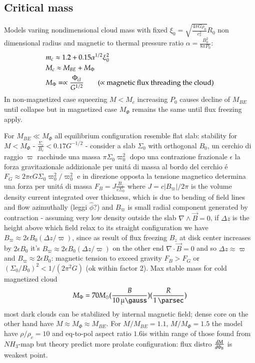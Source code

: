\documentclass[main.tex]{subfiles}
\begin{document}
\subsection{Critical mass}
Models variing nondimensional cloud mass with fixed $\xi_0=\sqrt{\frac{4\pi G\rho_0}{c_s^2}}R_0$ non dimensional radius and magnetic to thermal pressure ratio $\alpha=\frac{B_0^2}{8\pi P_0}$:
\begin{align*}
&m_c\approx1.2+0.15\alpha\expy{1/2}\xi_0^2\\
&M_c\approx M_{BE}+M_{\Phi}\\
&M_{\Phi}=\propto\frac{\Phi_{cl}}{G^{1/2}}\tag{$\propto$ magnetic flux threading the cloud}
\end{align*}
In non-magnetized case squeezing $M<M_c$ increasing $P_0$ causes decline of $M_{BE}$ until collapse but in magnetized case $M_{\Phi}$ remains the same until flux freezing apply.

For $M_{BE}\ll M_{\Phi}$ all equilibrium configuration resemble flat slab: stability for $M<M_{\Phi}$ - $\frac{\Sigma_c}{B_c}<0.17G^{-1/2}$ - consider a slab $\Sigma_0$ with orthogonal $B_0$, un cerchio di raggio $\varpi$ racchiude una massa $\pi\Sigma_0\varpi_0^2$ dopo una contrazione frazionale $\epsilon$ la forza gravitazionale addizionale per unit\'a di massa al bordo del cerchio \'e $F_G\approx2\pi\epsilon G\Sigma_0\varpi_0^2/\varpi_0^2$ e in direzione opposta la tensione magnetico determina una forza per unit\'a di massa $F_B=J\frac{B_z}{c\Sigma_0}$ where $J=c|B_{\varpi}|/2\pi$ is the volume density current integrated over thickness, which is due to bending of field lines and flow azimuthally (leggi $\hat{\phi}$?) and $B_{\varpi}$ is small radial component generated by contraction - assuming very low density outside the slab $\nabla\wedge\vec{B}=0$, if $\Delta z$ is the height above which field relax to its straight configuration we have $B_{\varpi}\approx2\epsilon B_0(\Delta z/\varpi)$, since as result of flux freezing $B_z$ at disk center increases by $2\epsilon B_0$ it's $B_{\varpi}\approx2\epsilon B_0(\Delta z/\varpi)$ on the other end $\nabla\cdot\vec{B}=0$  and so $\Delta z\approx\varpi$ and $B_{\varpi}\approx2\epsilon B_0$: magnetic tension to exceed gravity $F_B>F_G$ or $(\Sigma_0/B_0)^2<1/(2\pi^2G)$ (ok within factor 2).
Max stable mass for cold magnetized cloud
\[M_{\Phi}=70\msun(\frac{B}{\SI{10}{\micro\gauss}})(\frac{R}{\SI{1}{\parsec}})\]
most dark clouds can be stabilized by internal magnetic field; dense core on the other hand have $M\approx M_{\Phi}\approx M_{BE}$. For $M/M_{BE}=1.1$, $M/M_{\Phi}=1.5$ the model have $\rho/\rho_c=10$ and eq-to-pol aspect ratio $1.6$is within range of those found from $NH_3$-map but theory predict more prolate configuration: flux distro $\TDy{\Phi_B}{M}$ is weakest point.
\end{document}
